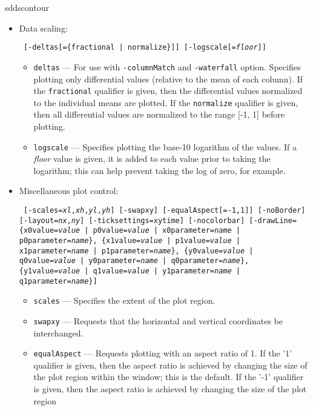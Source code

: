 \begin{sddsprog}{sddscontour}
\begin{itemize}
    \item Data scaling:
\begin{flushleft}{\tt
[-deltas[=\{fractional | normalize\}]] [-logscale[={\em floor}]]
}\end{flushleft}
        \begin{itemize}
        \item \verb|deltas| --- For use with \verb|-columnMatch| and \verb|-waterfall| option.  Specifies plotting 
        only differential values (relative to the mean of each column).  If the \verb|fractional| 
        qualifier is given, then the differential values normalized to the individual
        means are plotted.  If the \verb|normalize| qualifier is given, then all differential values
        are normalized to the range [-1, 1] before plotting.
        \item \verb|logscale| --- Specifies plotting the base-10 logarithm of the values.  If a
        {\em floor} value is given, it is added to each value prior to taking the logarithm; this
        can help prevent taking the log of zero, for example.
        \end{itemize}
    \item Miscellaneous plot control:
\begin{flushleft}{\tt
[-scales={\em xl},{\em xh},{\em yl},{\em yh}] 
[-swapxy] [-equalAspect[={-1,1}]]
[-noBorder] [-layout={\em nx},{\em ny}]
[-ticksettings={xy}time] [-nocolorbar] 
[-drawLine=\{x0value={\em value} | p0value={\em value} | x0parameter={\em name} | p0parameter={\em name}\},
            \{x1value={\em value} | p1value={\em value} | x1parameter={\em name} | p1parameter={\em name}\},
            \{y0value={\em value} | q0value={\em value} | y0parameter={\em name} | q0parameter={\em name}\},
            \{y1value={\em value} | q1value={\em value} | y1parameter={\em name} | q1parameter={\em name}\}]
}\end{flushleft}
        \begin{itemize}
        \item \verb|scales| --- Specifies the extent of the plot region.
        \item \verb|swapxy| --- Requests that the horizontal and vertical coordinates be interchanged.
        \item \verb|equalAspect| --- Requests plotting with an aspect ratio of 1.  If the '1' qualifier
        is given, then the aspect ratio is achieved by changing the size of the plot region within the window;
        this is the default.
        If the '-1' qualifier is given, then the aspect ratio is achieved by changing the size of the plot region

\end{itemize}
\end{itemize}
\end{sddsprog}
